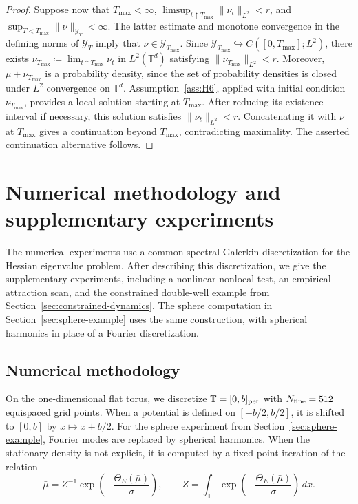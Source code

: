 \documentclass[11pt]{article}
\numberwithin{equation}{section}
\theoremstyle{definition}
\newcommand{\T}{\mathbb{T}}
\begin{document}
\begin{proof}
    Suppose now that $T_{\max} < \infty$, $\limsup_{t\uparrow T_{\max}} \|\nu_t\|_{L^2} < r$, and $\sup_{T < T_{\max}} \|\nu\|_{\mathcal{Y}_T} < \infty$.
    The latter estimate and monotone convergence in the defining norms of $\mathcal{Y}_T$ imply that $\nu \in \mathcal{Y}_{T_{\max}}$.
    Since $\mathcal{Y}_{T_{\max}} \hookrightarrow C([0,T_{\max}]; L^2)$, there exists $\nu_{T_{\max}} \coloneqq \lim_{t \uparrow T_{\max}} \nu_t$ in $L^2(\T^d)$ satisfying $\|\nu_{T_{\max}}\|_{L^2} < r$.
    Moreover, $\bar\mu + \nu_{T_{\max}}$ is a probability density, since the set of probability densities is closed under $L^2$ convergence on $\T^d$.
    Assumption~\ref{ass:H6}, applied with initial condition $\nu_{T_{\max}}$, provides a local solution starting at $T_{\max}$.
    After reducing its existence interval if necessary, this solution satisfies $\|\nu_t\|_{L^2} < r$. 
    Concatenating it with $\nu$ at $T_{\max}$ gives a continuation beyond $T_{\max}$, contradicting maximality.
    The asserted continuation alternative follows.
\end{proof}

\section{Numerical methodology and supplementary experiments}
\label{app:numerics}

The numerical experiments use a common spectral Galerkin discretization for the Hessian eigenvalue problem.
After describing this discretization, we give the supplementary experiments, including a nonlinear nonlocal test, an empirical attraction scan, and the constrained double-well example from Section~\ref{sec:constrained-dynamics}.
The sphere computation in Section~\ref{sec:sphere-example} uses the same construction, with spherical harmonics in place of a Fourier discretization.

\subsection{Numerical methodology}
\label{app:sec:numerical-methodology}

On the one-dimensional flat torus, we discretize $\T = [0,b]_{\rm per}$ with $N_{\rm fine} = 512$ equispaced grid points.
When a potential is defined on $[-b/2, b/2]$, it is shifted to $[0,b]$ by $x \mapsto x + b/2$.
For the sphere experiment from Section~\ref{sec:sphere-example}, Fourier modes are replaced by spherical harmonics.
When the stationary density is not explicit, it is computed by a fixed-point iteration of the relation
\[
\bar\mu = Z^{-1}\exp\left(-\frac{\Theta_E(\bar\mu)}{\sigma}\right), \qquad Z = \int_{\T} \exp\left(-\frac{\Theta_E(\bar\mu)}{\sigma}\right)\,dx.
\]
\end{document}
